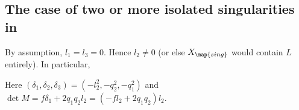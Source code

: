\documentclass[12pt]{report}
\begin{document}

    
    
    



\subsection{The case of two or more isolated singularities in }

By assumption, $l_1=l_3=0$.
Hence $l_2\neq 0$ (or else $X_{\map{sing}}$ would contain $L$ entirely).
In particular,

Here $(\delta_1,\delta_2,\delta_3) = (-l_2^2,-q_2^2,-q_1^2)$ and $\det{M} = f\delta_1+2q_1q_2l_2 = (-fl_2+2q_1q_2)l_2$.

\end{document}
